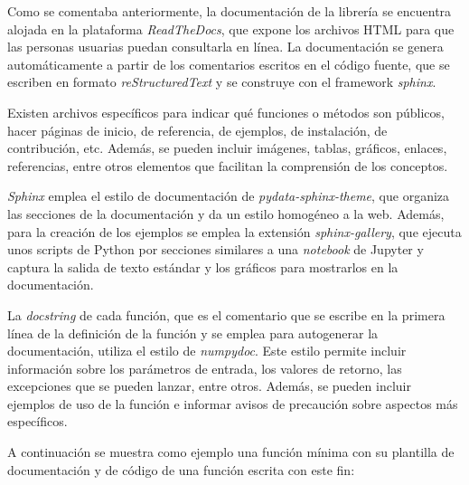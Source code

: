 Como se comentaba anteriormente, la documentación de la librería \pvlibpy{} se encuentra alojada en la plataforma \textit{ReadTheDocs}, que expone los archivos HTML para que las personas usuarias puedan consultarla en línea. La documentación se genera automáticamente a partir de los comentarios escritos en el código fuente, que se escriben en formato \textit{reStructuredText} y se construye con el framework \textit{sphinx}.

Existen archivos específicos para indicar qué funciones o métodos son públicos, hacer páginas de inicio, de referencia, de ejemplos, de instalación, de contribución, etc. Además, se pueden incluir imágenes, tablas, gráficos, enlaces, referencias, entre otros elementos que facilitan la comprensión de los conceptos.

\textit{Sphinx} emplea el estilo de documentación de \textit{pydata-sphinx-theme}, que organiza las secciones de la documentación y da un estilo homogéneo a la web. Además, para la creación de los ejemplos se emplea la extensión \textit{sphinx-gallery}, que ejecuta unos scripts de Python por secciones similares a una \textit{notebook} de Jupyter y captura la salida de texto estándar y los gráficos para mostrarlos en la documentación.

La \textit{docstring} de cada función, que es el comentario que se escribe en la primera línea de la definición de la función y se emplea para autogenerar la documentación, utiliza el estilo de \textit{numpydoc}. Este estilo permite incluir información sobre los parámetros de entrada, los valores de retorno, las excepciones que se pueden lanzar, entre otros. Además, se pueden incluir ejemplos de uso de la función e informar avisos de precaución sobre aspectos más específicos.

A continuación se muestra como ejemplo una función mínima con su plantilla de documentación y de código de una función escrita con este fin:

